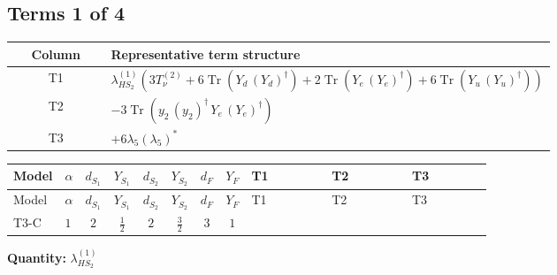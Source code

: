 \documentclass[8pt]{article}
\begin{document}
\begin{landscape}
\subsection*{Terms 1 of 4}
\begin{center}
\begin{tabular}{@{}c >{\raggedright\arraybackslash}p{0.82\linewidth}@{}}
\toprule
Column & Representative term structure \\
\midrule
T1 & \(\displaystyle {\lambda_{HS_2}^{(1)}} (3 T_{\nu}^{(2)}+6 \operatorname{Tr}\!\left({Y_d}\,\left({Y_d}\right)^{\dagger}\right)+2 \operatorname{Tr}\!\left({Y_e}\,\left({Y_e}\right)^{\dagger}\right)+6 \operatorname{Tr}\!\left({Y_u}\,\left({Y_u}\right)^{\dagger}\right))\) \\
\midrule
T2 & \(\displaystyle -3 \operatorname{Tr}\!\left({y_2}\,\left({y_2}\right)^{\dagger}\,{Y_e}\,\left({Y_e}\right)^{\dagger}\right)\) \\
\midrule
T3 & \(\displaystyle +6 {\lambda_5} \left({\lambda_5}\right)^{*}\) \\
\midrule
\bottomrule
\end{tabular}
\end{center}
\smallskip
\tiny
\begin{longtable}{@{}llcccccc >{\raggedright\arraybackslash}p{0.21\linewidth} >{\raggedright\arraybackslash}p{0.21\linewidth} >{\raggedright\arraybackslash}p{0.21\linewidth}@{}}
\toprule
Model & $\alpha$ & $d_{S_1}$ & $Y_{S_1}$ & $d_{S_2}$ & $Y_{S_2}$ & $d_F$ & $Y_F$ & T1 & T2 & T3 \\
\midrule
\endfirsthead
\toprule
Model & $\alpha$ & $d_{S_1}$ & $Y_{S_1}$ & $d_{S_2}$ & $Y_{S_2}$ & $d_F$ & $Y_F$ & T1 & T2 & T3 \\
\midrule
\endhead
T3-C & $1$ & $2$ & $\frac{1}{2}$ & $2$ & $\frac{3}{2}$ & $3$ & $1$ & \scriptsize\adjustbox{max width=\linewidth}{$\begin{gathered} {\lambda_{HS_2}^{(1)}} (3 T_{\nu}^{(2)}+6 \operatorname{Tr}\!\left({Y_d}\,\left({Y_d}\right)^{\dagger}\right)+2 \operatorname{Tr}\!\left({Y_e}\,\left({Y_e}\right)^{\dagger}\right)+6 \operatorname{Tr}\!\left({Y_u}\,\left({Y_u}\right)^{\dagger}\right))\end{gathered}$} & \scriptsize\adjustbox{max width=\linewidth}{$\begin{gathered} -3 \operatorname{Tr}\!\left({y_2}\,\left({y_2}\right)^{\dagger}\,{Y_e}\,\left({Y_e}\right)^{\dagger}\right)\end{gathered}$} & \scriptsize\adjustbox{max width=\linewidth}{$\begin{gathered} +6 {\lambda_5} \left({\lambda_5}\right)^{*}\end{gathered}$} \\
\midrule
\bottomrule
\end{longtable}
\clearpage
\noindent\textbf{Quantity: }$\lambda_{HS_2}^{(1)}$\par\smallskip

\end{landscape}
\end{document}
